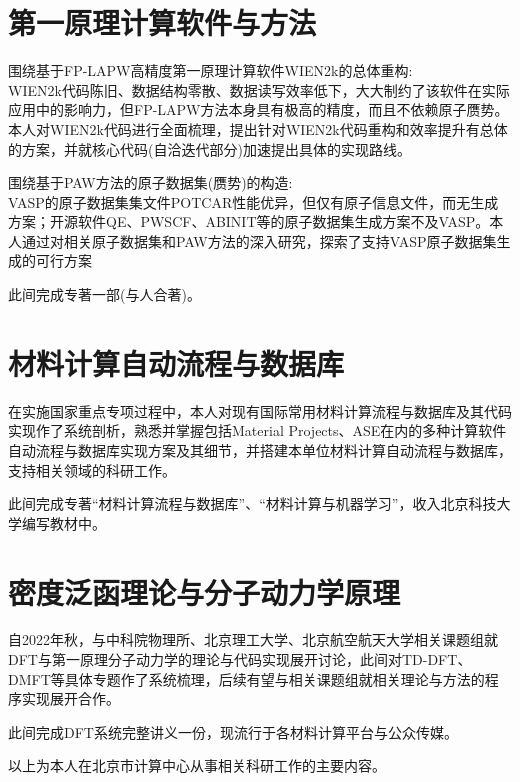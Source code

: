 \section{第一原理计算软件与方法}
围绕基于\textrm{FP-LAPW}高精度第一原理计算软件\textrm{WIEN2k}的总体重构:\\
\textrm{WIEN2k}代码陈旧、数据结构零散、数据读写效率低下，大大制约了该软件在实际应用中的影响力，但\textrm{FP-LAPW}方法本身具有极高的精度，而且不依赖原子赝势。本人对\textrm{WIEN2k}代码进行全面梳理，提出针对\textrm{WIEN2k}代码重构和效率提升有总体的方案，并就核心代码(自洽迭代部分)加速提出具体的实现路线。

围绕基于\textrm{PAW}方法的原子数据集(赝势)的构造:\\
\textrm{VASP}的原子数据集集文件\textrm{POTCAR}性能优异，但仅有原子信息文件，而无生成方案；开源软件\textrm{QE}、\textrm{PWSCF}、\textrm{ABINIT}等的原子数据集生成方案不及\textrm{VASP}。本人通过对相关原子数据集和\textrm{PAW}方法的深入研究，探索了支持\textrm{VASP}原子数据集生成的可行方案

此间完成专著一部(与人合著)。
\section{材料计算自动流程与数据库}
在实施国家重点专项过程中，本人对现有国际常用材料计算流程与数据库及其代码实现作了系统剖析，熟悉并掌握包括\textrm{Material Projects}、\textrm{ASE}在内的多种计算软件自动流程与数据库实现方案及其细节，并搭建本单位材料计算自动流程与数据库，支持相关领域的科研工作。

此间完成专著“材料计算流程与数据库”、“材料计算与机器学习”，收入北京科技大学编写教材中。

\section{密度泛函理论与分子动力学原理}
自2022年秋，与中科院物理所、北京理工大学、北京航空航天大学相关课题组就\textrm{DFT}与第一原理分子动力学的理论与代码实现展开讨论，此间对\textrm{TD-DFT}、\textrm{DMFT}等具体专题作了系统梳理，后续有望与相关课题组就相关理论与方法的程序实现展开合作。

此间完成\textrm{DFT}系统完整讲义一份，现流行于各材料计算平台与公众传媒。

以上为本人在北京市计算中心从事相关科研工作的主要内容。
